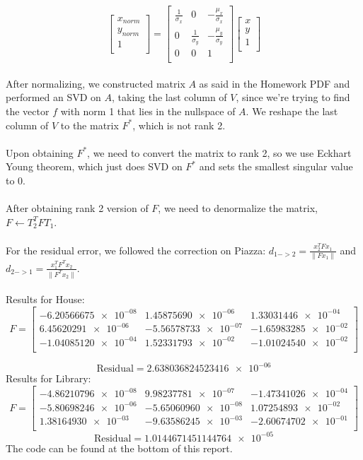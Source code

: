 \documentclass{article}\usepackage{amsmath,amssymb,amsthm,tikz,tkz-graph,color,chngpage,soul,hyperref,csquotes,graphicx,floatrow}\newcommand*{\QEDB}{\hfill\ensuremath{\square}}\newtheorem*{prop}{Proposition}\renewcommand{\theenumi}{\alph{enumi}}\usepackage[shortlabels]{enumitem}\usepackage[nobreak=true]{mdframed}\usetikzlibrary{matrix,calc}\MakeOuterQuote{"}\usepackage[margin=0.95in]{geometry} \newtheorem{theorem}{Theorem}
\begin{document}
\begin{mdframed}
\[ 
\begin{bmatrix}
    x_{norm} \\
    y_{norm} \\
    1 \\
  \end{bmatrix}
  =
\begin{bmatrix}
    \frac{1}{\sigma_{x}} & 0 & -\frac{\mu_{x}}{\sigma_{x}} \\
    0 & \frac{1}{\sigma_{y}} & -\frac{\mu_{y}}{\sigma_{y}} \\
    0 & 0 & 1 \\
\end{bmatrix}
\begin{bmatrix}
    x \\
    y \\
    1 \\
\end{bmatrix}
\]
\\After normalizing, we constructed matrix $ A $ as said in the Homework PDF and performed an SVD on $ A $, taking the last column of $ V $, since we're trying to find the vector $f$ with norm 1 that lies in the nullspace of $A$. We reshape the last column of $ V $ to the matrix $ F^* $, which is not rank 2.\\\\ Upon obtaining $ F^* $, we need to convert the matrix to rank 2, so we use Eckhart Young theorem, which just does SVD on $ F^* $ and sets the smallest singular value to 0. \\\\  After obtaining rank 2 version of $ F $, we need to denormalize the matrix, $ F \leftarrow T^{T}_{2}FT_{1} $. \\\\ For the residual error, we followed the correction on Piazza: $ d_{1->2} = \frac{x_2^TFx_1}{\|Fx_1\|} $ and $d_{2->1} = \frac{x_1^TF^Tx_2}{\|F^Tx_2\|}$. \\\\ Results for House:
\[ F = 
\begin{bmatrix}
 \num{-6.20566675e-08} & \num{1.45875690e-06} & \num{1.33031446e-04} \\
 \num{6.45620291e-06} & \num{-5.56578733e-07} & \num{-1.65983285e-02} \\
 \num{-1.04085120e-04} & \num{1.52331793e-02} & \num{-1.01024540e-02} \\
\end{bmatrix}
\]

\[ \text{Residual}= \num{2.638036824523416e-06} \]
Results for Library:
\[ F = 
\begin{bmatrix}
 \num{-4.86210796e-08} & \num{9.98237781e-07} & \num{-1.47341026e-04} \\
 \num{-5.80698246e-06} & \num{-5.65060960e-08} & \num{1.07254893e-02} \\
 \num{1.38164930e-03} & \num{-9.63586245e-03} & \num{-2.60674702e-01} \\
\end{bmatrix}
\]
\[ \text{Residual}= \num{1.0144671451144764e-05} \] The code can be found at the bottom of this report. 

\end{mdframed}
\end{document}
